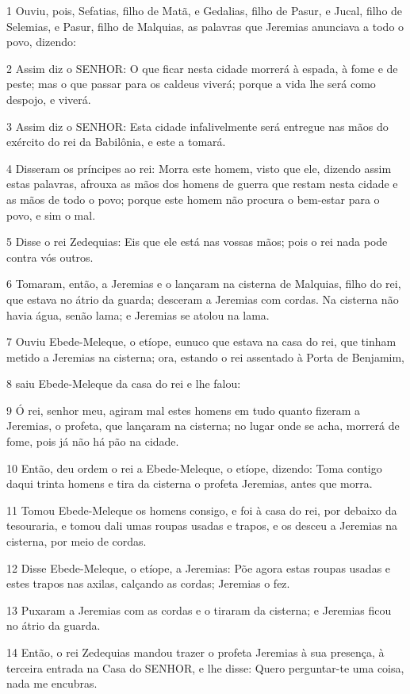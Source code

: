 \par 1 Ouviu, pois, Sefatias, filho de Matã, e Gedalias, filho de Pasur, e Jucal, filho de Selemias, e Pasur, filho de Malquias, as palavras que Jeremias anunciava a todo o povo, dizendo:
\par 2 Assim diz o SENHOR: O que ficar nesta cidade morrerá à espada, à fome e de peste; mas o que passar para os caldeus viverá; porque a vida lhe será como despojo, e viverá.
\par 3 Assim diz o SENHOR: Esta cidade infalivelmente será entregue nas mãos do exército do rei da Babilônia, e este a tomará.
\par 4 Disseram os príncipes ao rei: Morra este homem, visto que ele, dizendo assim estas palavras, afrouxa as mãos dos homens de guerra que restam nesta cidade e as mãos de todo o povo; porque este homem não procura o bem-estar para o povo, e sim o mal.
\par 5 Disse o rei Zedequias: Eis que ele está nas vossas mãos; pois o rei nada pode contra vós outros.
\par 6 Tomaram, então, a Jeremias e o lançaram na cisterna de Malquias, filho do rei, que estava no átrio da guarda; desceram a Jeremias com cordas. Na cisterna não havia água, senão lama; e Jeremias se atolou na lama.
\par 7 Ouviu Ebede-Meleque, o etíope, eunuco que estava na casa do rei, que tinham metido a Jeremias na cisterna; ora, estando o rei assentado à Porta de Benjamim,
\par 8 saiu Ebede-Meleque da casa do rei e lhe falou:
\par 9 Ó rei, senhor meu, agiram mal estes homens em tudo quanto fizeram a Jeremias, o profeta, que lançaram na cisterna; no lugar onde se acha, morrerá de fome, pois já não há pão na cidade.
\par 10 Então, deu ordem o rei a Ebede-Meleque, o etíope, dizendo: Toma contigo daqui trinta homens e tira da cisterna o profeta Jeremias, antes que morra.
\par 11 Tomou Ebede-Meleque os homens consigo, e foi à casa do rei, por debaixo da tesouraria, e tomou dali umas roupas usadas e trapos, e os desceu a Jeremias na cisterna, por meio de cordas.
\par 12 Disse Ebede-Meleque, o etíope, a Jeremias: Põe agora estas roupas usadas e estes trapos nas axilas, calçando as cordas; Jeremias o fez.
\par 13 Puxaram a Jeremias com as cordas e o tiraram da cisterna; e Jeremias ficou no átrio da guarda.
\par 14 Então, o rei Zedequias mandou trazer o profeta Jeremias à sua presença, à terceira entrada na Casa do SENHOR, e lhe disse: Quero perguntar-te uma coisa, nada me encubras.
